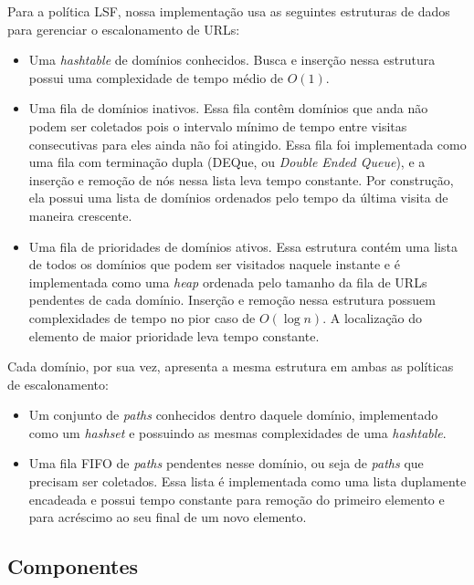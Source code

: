 \documentclass[10pt,twocolumn]{article}
\begin{document}
Para a política LSF, nossa implementação usa as seguintes estruturas de
dados para gerenciar o escalonamento de URLs:

\begin{itemize}

\item Uma \emph{hashtable} de domínios conhecidos. Busca e inserção
nessa estrutura possui uma complexidade de tempo médio de \(O\left(1 
\right)\).

\item Uma fila de domínios inativos. Essa fila contêm domínios que
anda não podem ser coletados pois o intervalo mínimo de tempo entre
visitas consecutivas para eles ainda não foi atingido. Essa fila foi
implementada como uma fila com terminação dupla (DEQue, ou \emph{Double
Ended Queue}), e a inserção e remoção de nós nessa lista leva tempo
constante. Por construção, ela possui uma lista de domínios ordenados
pelo tempo da última visita de maneira crescente.

\item Uma fila de prioridades de domínios ativos. Essa estrutura contém
uma lista de todos os domínios que podem ser visitados naquele instante
e é implementada como uma \emph{heap} ordenada pelo tamanho da fila de
URLs pendentes de cada domínio. Inserção e remoção nessa estrutura
possuem complexidades de tempo no pior caso de \(O\left(\log n\right)\).
A localização do elemento de maior prioridade leva tempo constante.

\end{itemize}


Cada domínio, por sua vez, apresenta a mesma estrutura em ambas as
políticas de escalonamento:
\begin{itemize}
\item Um conjunto de \emph{paths} conhecidos dentro daquele domínio,
implementado como um \emph{hashset} e possuindo as mesmas complexidades
de uma \emph{hashtable}.
\item Uma fila FIFO de \emph{paths} pendentes nesse domínio, ou seja de
\emph{paths} que precisam ser coletados. Essa lista é implementada como
uma lista duplamente encadeada e possui tempo constante para remoção do
primeiro elemento e para acréscimo ao seu final de um novo elemento.
\end{itemize}


\subsection{Componentes}
\end{document}
